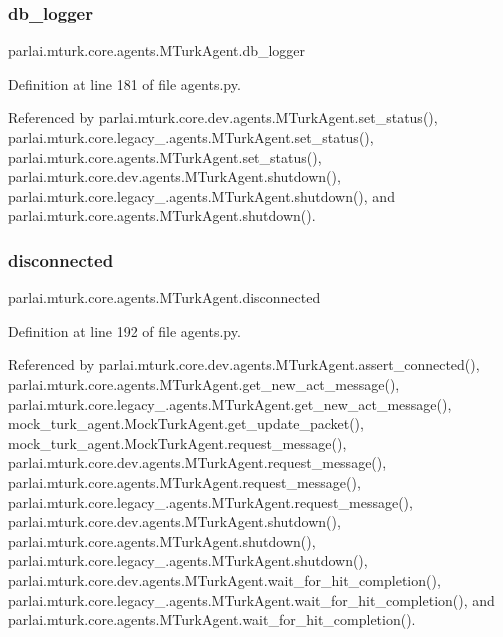 \subsubsection{\texorpdfstring{db\+\_\+logger}{db\_logger}}
{\footnotesize\ttfamily parlai.\+mturk.\+core.\+agents.\+M\+Turk\+Agent.\+db\+\_\+logger}



Definition at line 181 of file agents.\+py.



Referenced by parlai.\+mturk.\+core.\+dev.\+agents.\+M\+Turk\+Agent.\+set\+\_\+status(), parlai.\+mturk.\+core.\+legacy\+\_.\+agents.\+M\+Turk\+Agent.\+set\+\_\+status(), parlai.\+mturk.\+core.\+agents.\+M\+Turk\+Agent.\+set\+\_\+status(), parlai.\+mturk.\+core.\+dev.\+agents.\+M\+Turk\+Agent.\+shutdown(), parlai.\+mturk.\+core.\+legacy\+\_.\+agents.\+M\+Turk\+Agent.\+shutdown(), and parlai.\+mturk.\+core.\+agents.\+M\+Turk\+Agent.\+shutdown().

\mbox{\label{classparlai_1_1mturk_1_1core_1_1agents_1_1MTurkAgent_ad371cc18056672682b640deb702bc444}} 
\subsubsection{\texorpdfstring{disconnected}{disconnected}}
{\footnotesize\ttfamily parlai.\+mturk.\+core.\+agents.\+M\+Turk\+Agent.\+disconnected}



Definition at line 192 of file agents.\+py.



Referenced by parlai.\+mturk.\+core.\+dev.\+agents.\+M\+Turk\+Agent.\+assert\+\_\+connected(), parlai.\+mturk.\+core.\+agents.\+M\+Turk\+Agent.\+get\+\_\+new\+\_\+act\+\_\+message(), parlai.\+mturk.\+core.\+legacy\+\_.\+agents.\+M\+Turk\+Agent.\+get\+\_\+new\+\_\+act\+\_\+message(), mock\+\_\+turk\+\_\+agent.\+Mock\+Turk\+Agent.\+get\+\_\+update\+\_\+packet(), mock\+\_\+turk\+\_\+agent.\+Mock\+Turk\+Agent.\+request\+\_\+message(), parlai.\+mturk.\+core.\+dev.\+agents.\+M\+Turk\+Agent.\+request\+\_\+message(), parlai.\+mturk.\+core.\+agents.\+M\+Turk\+Agent.\+request\+\_\+message(), parlai.\+mturk.\+core.\+legacy\+\_.\+agents.\+M\+Turk\+Agent.\+request\+\_\+message(), parlai.\+mturk.\+core.\+dev.\+agents.\+M\+Turk\+Agent.\+shutdown(), parlai.\+mturk.\+core.\+agents.\+M\+Turk\+Agent.\+shutdown(), parlai.\+mturk.\+core.\+legacy\+\_.\+agents.\+M\+Turk\+Agent.\+shutdown(), parlai.\+mturk.\+core.\+dev.\+agents.\+M\+Turk\+Agent.\+wait\+\_\+for\+\_\+hit\+\_\+completion(), parlai.\+mturk.\+core.\+legacy\+\_.\+agents.\+M\+Turk\+Agent.\+wait\+\_\+for\+\_\+hit\+\_\+completion(), and parlai.\+mturk.\+core.\+agents.\+M\+Turk\+Agent.\+wait\+\_\+for\+\_\+hit\+\_\+completion().

